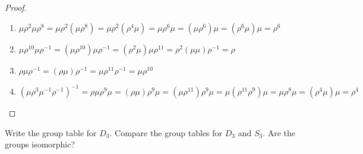 \begin{proof}
    \begin{enumerate}[label={\textbf{\alph*.}}]
        \item $\mu{\rho}^{2}\mu{\rho}^{8} = \mu{\rho}^{2}(\mu{\rho}^{8}) = \mu{\rho}^{2}({\rho}^{4}\mu) = \mu{\rho}^{6}\mu = {(\mu{\rho}^{6})}\mu = {({\rho}^{6}\mu)}\mu = \rho^{6}$
        \item $\mu{\rho}^{10}\mu{\rho}^{-1} = (\mu{\rho}^{10})\mu{\rho}^{-1} = ({\rho}^{2}\mu)\mu{\rho}^{11} = {\rho}^{2}(\mu\mu){\rho}^{-1} = \rho$
        \item $\rho\mu{\rho}^{-1} = (\rho\mu){\rho}^{-1} = \mu{\rho}^{11}{\rho}^{-1} = \mu{\rho}^{10}$
        \item ${(\mu{\rho}^{3}{\mu}^{-1}{\rho}^{-1})}^{-1} = \rho\mu\rho^{9}\mu = (\rho\mu)\rho^{9}\mu = (\mu\rho^{11})\rho^{9}\mu = \mu(\rho^{11}\rho^{9})\mu = \mu{\rho}^{8}\mu = ({\rho}^{4}\mu)\mu = \rho^{4}$
    \end{enumerate}
\end{proof}

\newpage
\begin{exercise}
    Write the group table for $D_{3}$. Compare the group tables for $D_{3}$ and $S_{3}$. Are the groups isomorphic?
\end{exercise}

